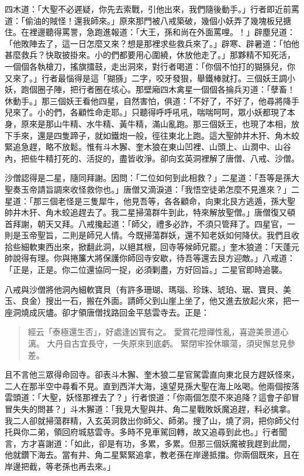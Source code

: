 四木道：「大聖不必遲疑，你先去索戰，引他出來，我們隨後動手。」行者即近前罵道：「偷油的賊怪！還我師來。」原來那門被八戒築破，幾個小妖弄了幾塊板兒搪住。在裡邊聽得罵詈，急跑進報道：「大王，孫和尚在外面罵哩。！」辟塵兒道：「他敗陣去了，這一日怎麼又來？想是那裡求些救兵來了。」辟寒、辟暑道：「怕他甚麼救兵？快取披掛來。小的們都要用心圍繞，休放他走了。」那夥精不知死活，一個個各執槍刀，搖旗擂鼓，走出洞來，對行者喝道：「你個不怕打的猢猻兒，你又來了。」行者最惱得是這「猢猻」二字，咬牙發狠，舉鐵棒就打。三個妖王調小妖，跑個圈子陣，把行者圈在垓心。那壁廂四木禽星一個個各掄兵刃道：「孽畜！休動手。」那三個妖王看他四星，自然害怕，俱道：「不好了，不好了，他尋將降手兒來了。小的們，各顧性命走耶。」只聽得呼呼吼吼，喘喘呵呵，眾小妖都現了本身，原來是那山牛精、水牛精、黃牛精，滿山亂跑。那三個妖王，也現了本相，放下手來，還是四隻蹄子，就如鐵炮一般，徑往東北上跑。這大聖帥井木犴、角木蛟緊追急趕，略不放鬆。惟有斗木獬、奎木狼在東山凹裡、山頭上、山澗中、山谷內，把些牛精打死的、活捉的，盡皆收淨。卻向玄英洞裡解了唐僧、八戒、沙僧。

沙僧認得是二星，隨同拜謝。因問：「二位如何到此相救？」二星道：「吾等是孫大聖奏玉帝請旨調來收怪救你也。」唐僧又滴淚道：「我悟空徒弟怎麼不見進來？」二星道：「那三個老怪是三隻犀牛，他見吾等，各各顧命，向東北艮方逃遁，孫大聖帥井木犴、角木蛟追趕去了。我二星掃蕩群牛到此，特來解放聖僧。」唐僧復又頓首拜謝，朝天又拜。八戒攙起道：「師父，禮多必詐，不須只管拜了。四星官，一則是玉帝聖旨，二則是師兄人情。今既掃蕩群妖，還不知老妖如何降伏。我們且收拾些細軟東西出來，掀翻此洞，以絕其根，回寺等候師兄罷。」奎木狼道：「天蓬元帥說得有理。你與捲簾大將保護你師回寺安歇，待吾等還去艮方迎敵。」八戒道：「正是，正是。你二位還協同一捉，必須剿盡，方好回旨。」二星官即時追襲。

八戒與沙僧將他洞內細軟寶貝（有許多珊瑚、瑪瑙、珍珠、琥珀、琚、寶貝、美玉、良金）搜出一石，搬在外面。請師父到山崖上坐了，他又進去放起火來，把一座洞燒成灰燼。卻才領唐僧找路回金平慈雲寺去。正是：
\begin{quote}
經云「泰極還生否」，好處逢凶實有之。
愛賞花燈禪性亂，喜遊美景道心漓。
大丹自古宜長守，一失原來到底虧。
緊閉牢拴休曠蕩，須臾懈怠見參差。
\end{quote}

且不言他三眾得命回寺。卻表斗木獬、奎木狼二星官駕雲直向東北艮方趕妖怪來，二人在那半空中尋看不見。直到西洋大海，遠望見孫大聖在海上吆喝。他兩個按落雲頭道：「大聖，妖怪那裡去了？」行者恨道：「你兩個怎麼不來追降？這會子卻冒冒失失的問甚？」斗木獬道：「我見大聖與井、角二星戰敗妖魔追趕，料必擒拿。我二人卻就掃蕩群精，入玄英洞救出你師父、師弟。搜了山，燒了洞，把你師父付托與你二弟，領回府城慈雲寺。多時不見車駕回轉，故又追尋到此也。」行者聞言，方才喜謝道：「如此，卻是有功，多累，多累。但那三個妖魔被我趕到此間，他就鑽下海去。當有井、角二星緊緊追拿，教老孫在岸邊抵擋。你兩個既來，且在岸邊把截，等老孫也再去來。」


